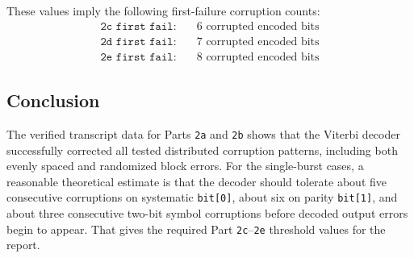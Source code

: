 \documentclass{article}
\begin{document}
These values imply the following first-failure corruption counts:
\[
\begin{aligned}
\texttt{2c first fail:} & \quad 6 \text{ corrupted encoded bits} \\
\texttt{2d first fail:} & \quad 7 \text{ corrupted encoded bits} \\
\texttt{2e first fail:} & \quad 8 \text{ corrupted encoded bits}
\end{aligned}
\]

\subsection{Conclusion}

The verified transcript data for Parts \texttt{2a} and \texttt{2b} shows that the Viterbi decoder successfully corrected all tested distributed corruption patterns, including both evenly spaced and randomized block errors. For the single-burst cases, a reasonable theoretical estimate is that the decoder should tolerate about five consecutive corruptions on systematic \texttt{bit[0]}, about six on parity \texttt{bit[1]}, and about three consecutive two-bit symbol corruptions before decoded output errors begin to appear. That gives the required Part \texttt{2c}--\texttt{2e} threshold values for the report.
\end{document}
